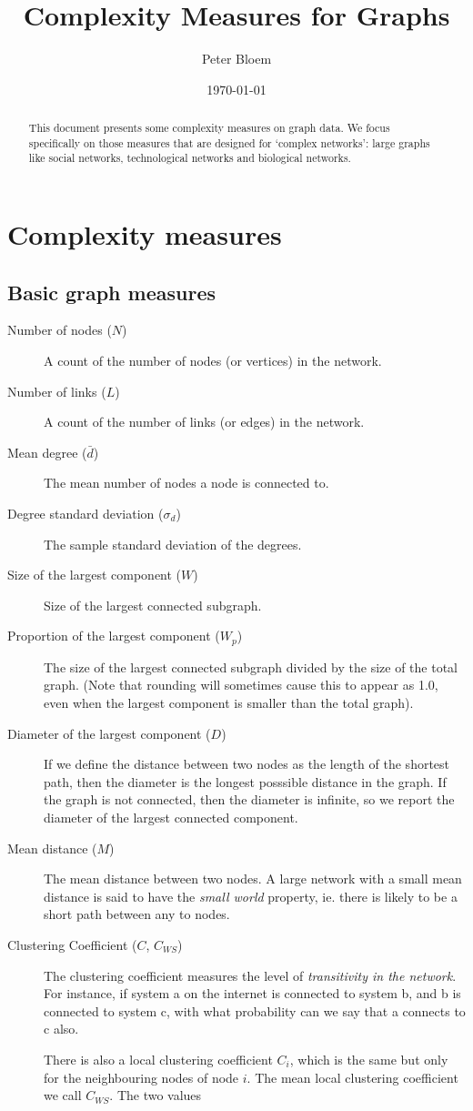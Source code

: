 \documentclass{article}
\title{Complexity Measures for Graphs}
\author{Peter Bloem}
\date{\today}
\theoremstyle{definition}
\begin{document}
\maketitle

\begin{abstract}
\noindent This document presents some complexity measures on graph data. We focus specifically on those measures that are designed for `complex networks': large graphs like social networks, technological networks and biological networks.
\end{abstract}

\section*{Complexity measures}
\subsection*{Basic graph measures}
\begin{description}
\item[Number of nodes ($N$)] A count of the number of nodes (or vertices) in the network.
\item[Number of links ($L$)] A count of the number of links (or edges) in the network. 
\item[Mean degree ($\bar{d}$)] The mean number of nodes a node is connected to.
\item[Degree standard deviation ($\sigma_d$)]  The sample standard deviation of the degrees.
\item[Size of the largest component ($W$)] Size of the largest connected subgraph.
\item[Proportion of the largest component ($W_p$)] The size of the largest connected subgraph divided by the size of the total graph. (Note that rounding will sometimes cause this to appear as 1.0, even when the largest component is smaller than the total graph).
\item[Diameter of the largest component ($D$)] If we define the distance between two nodes as the length of the shortest path, then the diameter is the longest posssible distance in the graph. If the graph is not connected, then the diameter is infinite, so we report the diameter of the largest connected component.  
\item[Mean distance ($M$)] The mean distance between two nodes. A large network with a small mean distance is said to have the \textit{small world} property, ie. there is likely to be a short path between any to nodes.
\item[Clustering Coefficient ($C$, $C_{WS}$)] The clustering coefficient measures the level of \textit{transitivity in the network}. For instance, if system a on the internet is connected to system b, and b is connected to system c, with what probability can we say that a connects to c also.

There is also a local clustering coefficient $C_i$, which is the same but only for the neighbouring nodes of node $i$. The mean local clustering coefficient we call $C_{WS}$. The two values  
\end{description}
\end{document}
